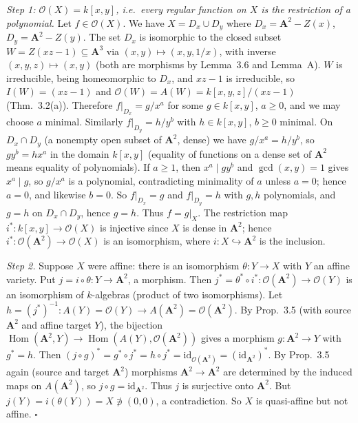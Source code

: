 \documentclass[11pt]{article}
\begin{document}
\pf
\emph{Step 1: $\mathcal O(X)=k[x,y]$, i.e.\ every regular function on $X$ is the restriction of a polynomial.} Let $f\in\mathcal O(X)$. We have $X=D_x\cup D_y$ where $D_x=\mathbf A^2-Z(x)$, $D_y=\mathbf A^2-Z(y)$. The set $D_x$ is isomorphic to the closed subset $W=Z(xz-1)\subseteq\mathbf A^3$ via $(x,y)\mapsto(x,y,1/x)$, with inverse $(x,y,z)\mapsto(x,y)$ (both are morphisms by Lemma~3.6 and Lemma~A). $W$ is irreducible, being homeomorphic to $D_x$, and $xz-1$ is irreducible, so $I(W)=(xz-1)$ and $\mathcal O(W)=A(W)=k[x,y,z]/(xz-1)$ (Thm.~3.2(a)). Therefore $f|_{D_x}=g/x^a$ for some $g\in k[x,y]$, $a\geq0$, and we may choose $a$ minimal. Similarly $f|_{D_y}=h/y^b$ with $h\in k[x,y]$, $b\ge0$ minimal. On $D_x\cap D_y$ (a nonempty open subset of $\mathbf A^2$, dense) we have $g/x^a=h/y^b$, so $gy^b=hx^a$ in the domain $k[x,y]$ (equality of functions on a dense set of $\mathbf A^2$ means equality of polynomials). If $a\ge1$, then $x^a\mid gy^b$ and $\gcd(x,y)=1$ gives $x^a\mid g$, so $g/x^a$ is a polynomial, contradicting minimality of $a$ unless $a=0$; hence $a=0$, and likewise $b=0$. So $f|_{D_x}=g$ and $f|_{D_y}=h$ with $g,h$ polynomials, and $g=h$ on $D_x\cap D_y$, hence $g=h$. Thus $f=g|_X$. The restriction map $i^*:k[x,y]\to\mathcal O(X)$ is injective since $X$ is dense in $\mathbf A^2$; hence $i^*:\mathcal O(\mathbf A^2)\to\mathcal O(X)$ is an isomorphism, where $i:X\hookrightarrow\mathbf A^2$ is the inclusion.

\emph{Step 2.} Suppose $X$ were affine: there is an isomorphism $\theta:Y\to X$ with $Y$ an affine variety. Put $j=i\circ\theta:Y\to\mathbf A^2$, a morphism. Then $j^*=\theta^*\circ i^*:\mathcal O(\mathbf A^2)\to\mathcal O(Y)$ is an isomorphism of $k$-algebras (product of two isomorphisms). Let $h=(j^*)^{-1}:A(Y)=\mathcal O(Y)\to A(\mathbf A^2)=\mathcal O(\mathbf A^2)$. By Prop.~3.5 (with source $\mathbf A^2$ and affine target $Y$), the bijection $\operatorname{Hom}(\mathbf A^2,Y)\to\operatorname{Hom}(A(Y),\mathcal O(\mathbf A^2))$ gives a morphism $g:\mathbf A^2\to Y$ with $g^*=h$. Then $(j\circ g)^*=g^*\circ j^*=h\circ j^*=\mathrm{id}_{\mathcal O(\mathbf A^2)}=(\mathrm{id}_{\mathbf A^2})^*$. By Prop.~3.5 again (source and target $\mathbf A^2$) morphisms $\mathbf A^2\to\mathbf A^2$ are determined by the induced maps on $A(\mathbf A^2)$, so $j\circ g=\mathrm{id}_{\mathbf A^2}$. Thus $j$ is surjective onto $\mathbf A^2$. But $j(Y)=i(\theta(Y))=X\not\ni(0,0)$, a contradiction. So $X$ is quasi-affine but not affine. \hfill$\square$
\end{document}

